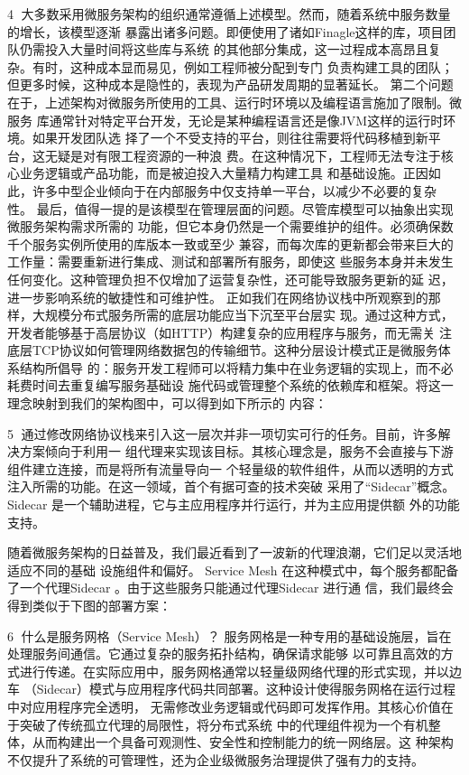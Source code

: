                                                        4
大多数采用微服务架构的组织通常遵循上述模型。然而，随着系统中服务数量的增长，该模型逐渐
暴露出诸多问题。即便使用了诸如Finagle这样的库，项目团队仍需投入大量时间将这些库与系统
的其他部分集成，这一过程成本高昂且复杂。有时，这种成本显而易见，例如工程师被分配到专门
负责构建工具的团队；但更多时候，这种成本是隐性的，表现为产品研发周期的显著延长。
第二个问题在于，上述架构对微服务所使用的工具、运行时环境以及编程语言施加了限制。微服务
库通常针对特定平台开发，无论是某种编程语言还是像JVM这样的运行时环境。如果开发团队选
择了一个不受支持的平台，则往往需要将代码移植到新平台，这无疑是对有限工程资源的一种浪
费。在这种情况下，工程师无法专注于核心业务逻辑或产品功能，而是被迫投入大量精力构建工具
和基础设施。正因如此，许多中型企业倾向于在内部服务中仅支持单一平台，以减少不必要的复杂
性。
最后，值得一提的是该模型在管理层面的问题。尽管库模型可以抽象出实现微服务架构需求所需的
功能，但它本身仍然是一个需要维护的组件。必须确保数千个服务实例所使用的库版本一致或至少
兼容，而每次库的更新都会带来巨大的工作量：需要重新进行集成、测试和部署所有服务，即使这
些服务本身并未发生任何变化。这种管理负担不仅增加了运营复杂性，还可能导致服务更新的延
迟，进一步影响系统的敏捷性和可维护性。
正如我们在网络协议栈中所观察到的那样，大规模分布式服务所需的底层功能应当下沉至平台层实
现。通过这种方式，开发者能够基于高层协议（如HTTP）构建复杂的应用程序与服务，而无需关
注底层TCP协议如何管理网络数据包的传输细节。这种分层设计模式正是微服务体系结构所倡导
的：服务开发工程师可以将精力集中在业务逻辑的实现上，而不必耗费时间去重复编写服务基础设
施代码或管理整个系统的依赖库和框架。将这一理念映射到我们的架构图中，可以得到如下所示的
内容：




                                             5
通过修改网络协议栈来引入这一层次并非一项切实可行的任务。目前，许多解决方案倾向于利用一
组代理来实现该目标。其核心理念是，服务不会直接与下游组件建立连接，而是将所有流量导向一
个轻量级的软件组件，从而以透明的方式注入所需的功能。在这一领域，首个有据可查的技术突破
采用了“Sidecar”概念。Sidecar 是一个辅助进程，它与主应用程序并行运行，并为主应用提供额
外的功能支持。




随着微服务架构的日益普及，我们最近看到了一波新的代理浪潮，它们足以灵活地适应不同的基础
设施组件和偏好。
Service Mesh
在这种模式中，每个服务都配备了一个代理Sidecar 。由于这些服务只能通过代理Sidecar 进行通
信，我们最终会得到类似于下图的部署方案：




                                                  6
什么是服务网格（Service Mesh）？
服务网格是一种专用的基础设施层，旨在处理服务间通信。它通过复杂的服务拓扑结构，确保请求能够
以可靠且高效的方式进行传递。在实际应用中，服务网格通常以轻量级网络代理的形式实现，并以边车
（Sidecar）模式与应用程序代码共同部署。这种设计使得服务网格在运行过程中对应用程序完全透明，
无需修改业务逻辑或代码即可发挥作用。其核心价值在于突破了传统孤立代理的局限性，将分布式系统
中的代理组件视为一个有机整体，从而构建出一个具备可观测性、安全性和控制能力的统一网络层。这
种架构不仅提升了系统的可管理性，还为企业级微服务治理提供了强有力的支持。

